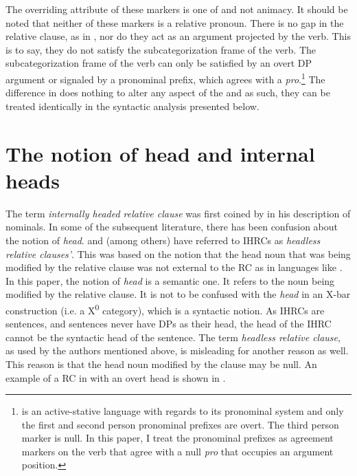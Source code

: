 \documentclass[output=paper]{LSP/langsci}
\begin{document}
The overriding attribute of these markers is one of  and not animacy. It should be noted that neither of these markers is a relative pronoun. There is no gap in the relative clause, as in , nor do they act as an argument projected by the verb. This is to say, they do not satisfy the subcategorization frame of the verb.  The subcategorization frame of the verb can only be satisfied by an overt DP argument or signaled by a pronominal prefix, which agrees with a \textit{pro}.\footnote{ is an active-stative language with regards to its pronominal system and only the first and second person pronominal prefixes are overt. The third person marker is null. In this paper, I treat the pronominal prefixes as agreement markers on the verb that agree with a null \textit{pro} that occupies an argument position.} The difference in  does nothing to alter any aspect of the  and as such, they can be treated identically in the syntactic analysis presented below.

\section{The notion of head and internal heads}\label{sec:boyle:3}

The term \textit{internally headed relative clause} was first coined by \citet{Gorbet1976} in his description of  nominals.  In some of the subsequent literature, there has been confusion about the notion of \textit{head}. \citet{Coleetal1982} and \citet{Weber1983} (among others) have referred to IHRCs as \textit{headless relative clauses'}. This was based on the notion that the head noun that was being modified by the relative clause was not external to the RC as in languages like . In this paper, the notion of \textit{head} is a semantic one. It refers to the noun being modified by the relative clause. It is not to be confused with the \textit{head} in an X-bar construction (i.e. a X\textsuperscript{0} category), which is a syntactic notion. As IHRCs are sentences, and sentences never have DPs as their head, the head of the IHRC cannot be the syntactic head of the sentence.  The term \textit{headless relative clause}, as used by the authors mentioned above, is misleading for another reason as well.  This reason is that the head noun modified by the clause may be null.  An example of a RC in  with an overt head is shown in .
\end{document}
